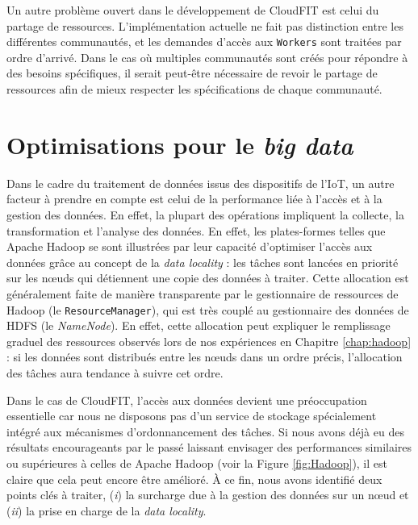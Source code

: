 Un autre problème ouvert dans le développement de CloudFIT est celui du partage de ressources. L'implémentation actuelle ne fait pas distinction entre les différentes communautés, et les demandes d'accès aux \texttt{Workers} sont traitées par ordre d'arrivé. Dans le cas où multiples communautés sont créés pour répondre à des besoins spécifiques, il serait peut-être nécessaire de revoir le partage de ressources afin de mieux respecter les spécifications de chaque communauté. 

 

\section{Optimisations pour le \textit{big data}}
%
Dans le cadre du traitement de données issus des dispositifs de l'IoT, un autre facteur à prendre en compte est celui de la performance liée à l'accès et à la gestion des données. En effet, la plupart des opérations impliquent la collecte, la transformation et l'analyse des données. En effet, les plates-formes telles que Apache Hadoop se sont illustrées par leur capacité d'optimiser l'accès aux données grâce au concept de la \textit{data locality} : les tâches sont lancées en priorité sur les n{\oe}uds qui détiennent une copie des données à traiter. Cette allocation est généralement faite de manière transparente par le gestionnaire de ressources de Hadoop (le \texttt{ResourceManager}), qui est très couplé au gestionnaire des données de HDFS (le \textit{NameNode}). En effet, cette allocation peut expliquer le remplissage graduel des ressources observés lors de nos expériences en Chapitre \ref{chap:hadoop} : si les données sont distribués entre les n{\oe}uds dans un ordre précis, l'allocation des tâches aura tendance à suivre cet ordre.

Dans le cas de CloudFIT, l'accès aux données devient une préoccupation essentielle car nous ne disposons pas d'un service de stockage spécialement intégré aux mécanismes d'ordonnancement des tâches. Si nous avons déjà eu des résultats encourageants par le passé \cite{Steffenel2015Roma} laissant envisager des performances similaires ou supérieures à celles de Apache Hadoop (voir la Figure \ref{fig:Hadoop}), il est claire que cela peut encore être amélioré. À ce fin, nous avons identifié deux points clés à traiter, (\textit{i}) la surcharge due à la gestion des données sur un n{\oe}ud et (\textit{ii}) la prise en charge de la \textit{data locality}. 

